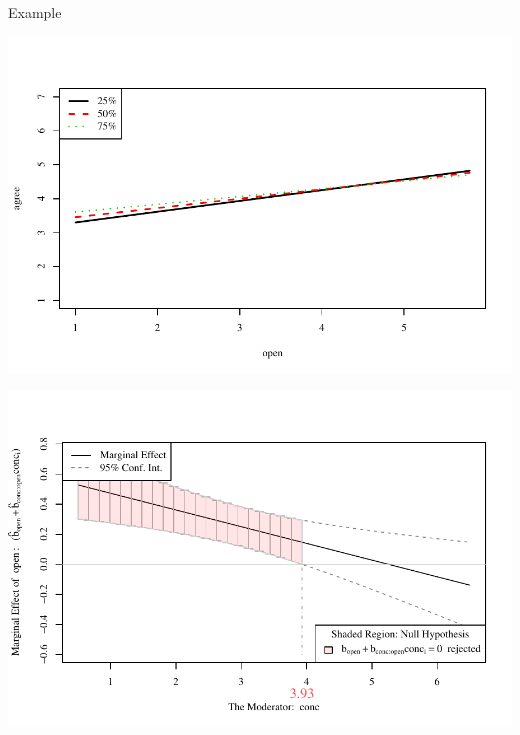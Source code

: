 \documentclass{beamer}
\begin{document}
\begin{frame}[allowframebreaks]{Example}
    


\pagebreak



\pagebreak



\pagebreak



\pagebreak



\pagebreak



\pagebreak


\includegraphics{sweaveFiles/-008}

\pagebreak


\includegraphics{sweaveFiles/-009}

\end{frame}
\end{document}
